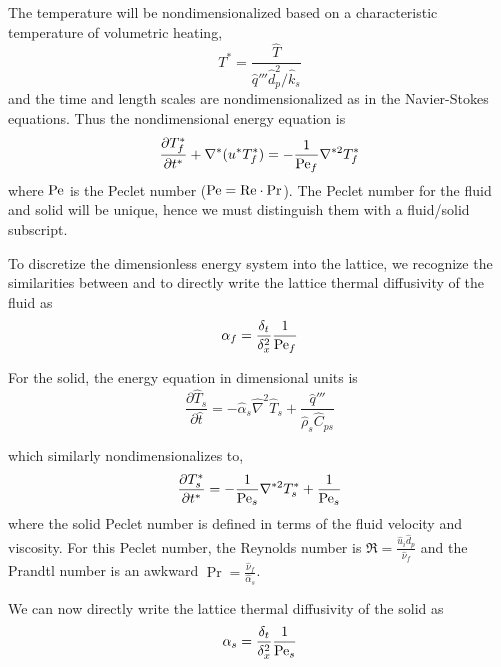 The temperature will be nondimensionalized based on a characteristic temperature of volumetric heating,
\begin{equation}
	T^* = \frac{\hat{T}}{\hat{q}''' \hat{d}_p^2/\hat{k}_s}
\end{equation}
and the time and length scales are nondimensionalized as in the Navier-Stokes equations. Thus the nondimensional energy equation is
\begin{equation}\label{eq:non-dim-energy}
	\frac{\partial T^*_f}{\partial t^*} + \nabla^*(u^*T^*_f) = -\frac{1}{\mathrm{Pe}_f} \nabla^{*2}T^*_f
\end{equation}
where $\mathrm{Pe}$ is the Peclet number ($\mathrm{Pe} = \mathrm{Re}\cdot \mathrm{Pr}$). The Peclet number for the fluid and solid will be unique, hence we must distinguish them with a fluid/solid subscript.

To discretize the dimensionless energy system into the lattice, we recognize the similarities between  and  to directly write the lattice thermal diffusivity of the fluid as
\begin{equation}
	\alpha_f = \frac{\delta_t}{\delta_x^2}\frac{1}{\mathrm{Pe}_f}
\end{equation}

For the solid, the energy equation in dimensional units is
\begin{equation}
	\frac{\partial \hat{T}_s}{\partial \hat{t}} = -\hat{\alpha}_s\hat{\nabla}^2\hat{T}_s + \frac{\hat{q}'''}{\hat{\rho}_s\hat{C}_{ps}}
\end{equation}

which similarly nondimensionalizes to,
\begin{equation}\label{eq:non-dim-energy-solid}
	\frac{\partial T^*_s}{\partial t^*} = -\frac{1}{\mathrm{Pe}_s} \nabla^{*2}T^*_s + \frac{1}{\mathrm{Pe}_s}
\end{equation}
where the solid Peclet number is defined in terms of the fluid velocity and viscosity. For this Peclet number, the Reynolds number is $\Re = \frac{\hat{u}_i \hat{d}_p}{\hat{\nu}_f}$ and the Prandtl number is an awkward $\Pr = \frac{\hat{\nu}_f}{\hat{\alpha}_s}$. 

We can now directly write the lattice thermal diffusivity of the solid as
\begin{equation}
	\alpha_s = \frac{\delta_t}{\delta_x^2}\frac{1}{\mathrm{Pe}_s}
\end{equation}

